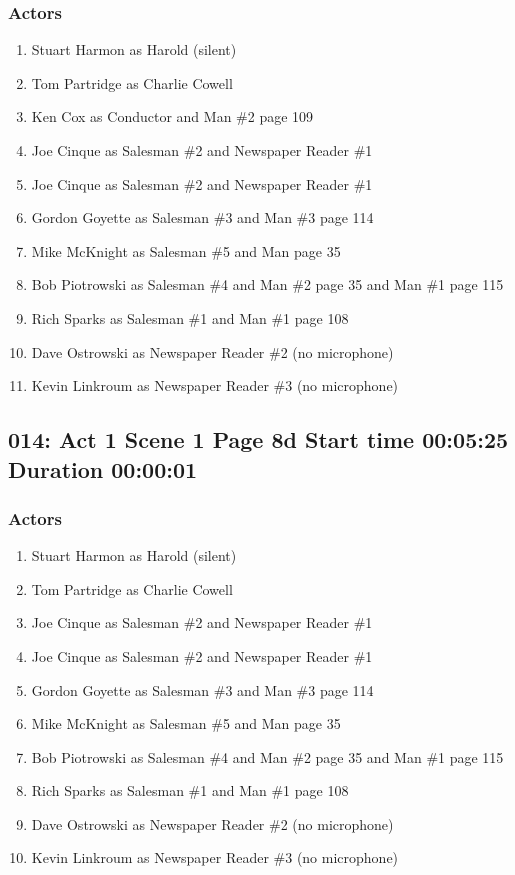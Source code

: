 \subsubsection{Actors}
\begin{enumerate}
\item Stuart Harmon as Harold (silent)
\item Tom Partridge as Charlie Cowell
\item Ken Cox as Conductor and Man \#2 page 109
\item Joe Cinque as Salesman \#2 and Newspaper Reader \#1
\item Joe Cinque as Salesman \#2 and Newspaper Reader \#1
\item Gordon Goyette as Salesman \#3 and Man \#3 page 114
\item Mike McKnight as Salesman \#5 and Man page 35
\item Bob Piotrowski as Salesman \#4 and Man \#2 page 35 and Man \#1 page 115
\item Rich Sparks as Salesman \#1 and Man \#1 page 108
\item Dave Ostrowski as Newspaper Reader \#2 (no microphone)
\item Kevin Linkroum as Newspaper Reader \#3 (no microphone)
\end{enumerate}


\subsection{014: Act 1 Scene 1 Page 8d Start time 00:05:25 Duration 00:00:01}

\subsubsection{Actors}
\begin{enumerate}
\item Stuart Harmon as Harold (silent)
\item Tom Partridge as Charlie Cowell
\item Joe Cinque as Salesman \#2 and Newspaper Reader \#1
\item Joe Cinque as Salesman \#2 and Newspaper Reader \#1
\item Gordon Goyette as Salesman \#3 and Man \#3 page 114
\item Mike McKnight as Salesman \#5 and Man page 35
\item Bob Piotrowski as Salesman \#4 and Man \#2 page 35 and Man \#1 page 115
\item Rich Sparks as Salesman \#1 and Man \#1 page 108
\item Dave Ostrowski as Newspaper Reader \#2 (no microphone)
\item Kevin Linkroum as Newspaper Reader \#3 (no microphone)
\end{enumerate}


